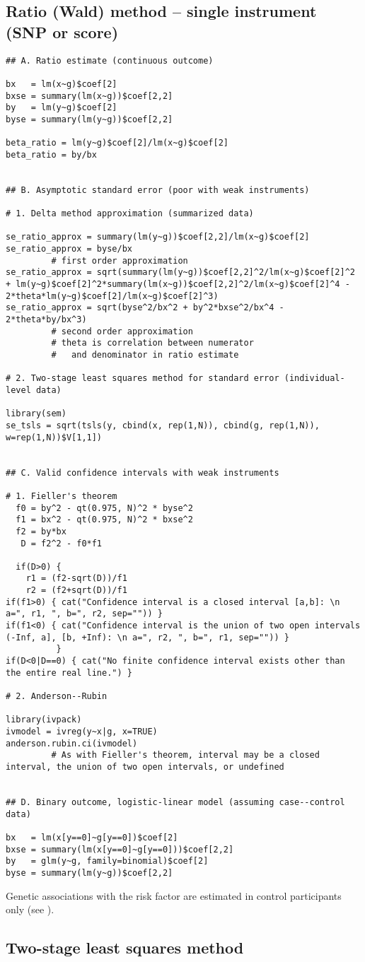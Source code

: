\documentclass[a4paper,12pt]{article} %
\begin{document}
\subsection{Ratio (Wald) method -- single instrument (SNP or score)}
\begin{lstlisting}
## A. Ratio estimate (continuous outcome)

bx   = lm(x~g)$coef[2]
bxse = summary(lm(x~g))$coef[2,2]
by   = lm(y~g)$coef[2]
byse = summary(lm(y~g))$coef[2,2]

beta_ratio = lm(y~g)$coef[2]/lm(x~g)$coef[2]
beta_ratio = by/bx


## B. Asymptotic standard error (poor with weak instruments)

# 1. Delta method approximation (summarized data)

se_ratio_approx = summary(lm(y~g))$coef[2,2]/lm(x~g)$coef[2]
se_ratio_approx = byse/bx
         # first order approximation
se_ratio_approx = sqrt(summary(lm(y~g))$coef[2,2]^2/lm(x~g)$coef[2]^2 + lm(y~g)$coef[2]^2*summary(lm(x~g))$coef[2,2]^2/lm(x~g)$coef[2]^4 - 2*theta*lm(y~g)$coef[2]/lm(x~g)$coef[2]^3)
se_ratio_approx = sqrt(byse^2/bx^2 + by^2*bxse^2/bx^4 - 2*theta*by/bx^3)
         # second order approximation
         # theta is correlation between numerator
         #   and denominator in ratio estimate

# 2. Two-stage least squares method for standard error (individual-level data)

library(sem)
se_tsls = sqrt(tsls(y, cbind(x, rep(1,N)), cbind(g, rep(1,N)), w=rep(1,N))$V[1,1])


## C. Valid confidence intervals with weak instruments

# 1. Fieller's theorem
  f0 = by^2 - qt(0.975, N)^2 * byse^2
  f1 = bx^2 - qt(0.975, N)^2 * bxse^2
  f2 = by*bx
   D = f2^2 - f0*f1

  if(D>0) {
    r1 = (f2-sqrt(D))/f1
    r2 = (f2+sqrt(D))/f1
if(f1>0) { cat("Confidence interval is a closed interval [a,b]: \n a=", r1, ", b=", r2, sep="")) }
if(f1<0) { cat("Confidence interval is the union of two open intervals (-Inf, a], [b, +Inf): \n a=", r2, ", b=", r1, sep="")) }
          }
if(D<0|D==0) { cat("No finite confidence interval exists other than the entire real line.") }

# 2. Anderson--Rubin

library(ivpack)
ivmodel = ivreg(y~x|g, x=TRUE)
anderson.rubin.ci(ivmodel)
         # As with Fieller's theorem, interval may be a closed interval, the union of two open intervals, or undefined
         
         
## D. Binary outcome, logistic-linear model (assuming case--control data)

bx   = lm(x[y==0]~g[y==0])$coef[2]
bxse = summary(lm(x[y==0]~g[y==0]))$coef[2,2]
by   = glm(y~g, family=binomial)$coef[2]
byse = summary(lm(y~g))$coef[2,2]
\end{lstlisting}

Genetic associations with the risk factor are estimated in control participants only (see \cite{bowden2011}).
\clearpage

\subsection{Two-stage least squares method}

\clearpage
\makeatletter
\renewcommand\@biblabel[1]{}
\makeatother


\end{document}
